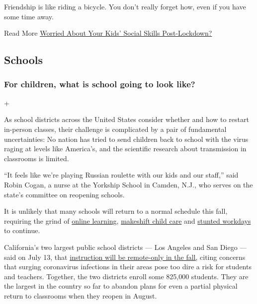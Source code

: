 Friendship is like riding a bicycle. You don't really forget how, even
if you have some time away.

 Read More
\href{https://www.nytimes.com/2020/06/18/parenting/kids-social-needs-quarantine.html}{Worried
About Your Kids' Social Skills Post-Lockdown?}

\hypertarget{schools}{%
\subsection{Schools}\label{schools}}

\hypertarget{for-children-what-is-school-going-to-look-like}{%
\subsubsection{For children, what is school going to look
like?}\label{for-children-what-is-school-going-to-look-like}}

+

As school districts across the United States consider whether and how to
restart in-person classes, their challenge is complicated by a pair of
fundamental uncertainties: No nation has tried to send children back to
school with the virus raging at levels like America's, and the
scientific research about transmission in classrooms is limited.

``It feels like we're playing Russian roulette with our kids and our
staff,'' said Robin Cogan, a nurse at the Yorkship School in Camden,
N.J., who serves on the state's committee on reopening schools.

It is unlikely that many schools will return to a normal schedule this
fall, requiring the grind of
\href{https://www.nytimes.com/2020/06/05/us/coronavirus-education-lost-learning.html}{online
learning,}
\href{https://www.nytimes.com/2020/05/29/us/coronavirus-child-care-centers.html}{makeshift
child care} and
\href{https://www.nytimes.com/2020/06/03/business/economy/coronavirus-working-women.html}{stunted
workdays} to continue.

California's two largest public school districts --- Los Angeles and San
Diego --- said on July 13, that
\href{https://www.nytimes.com/2020/07/13/us/lausd-san-diego-school-reopening.html}{instruction
will be remote-only in the fall,} citing concerns that surging
coronavirus infections in their areas pose too dire a risk for students
and teachers. Together, the two districts enroll some 825,000 students.
They are the largest in the country so far to abandon plans for even a
partial physical return to classrooms when they reopen in August.

